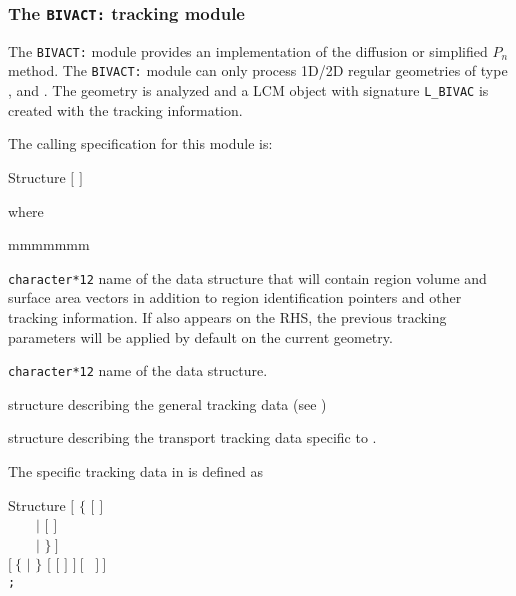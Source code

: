 \subsubsection{The {\tt BIVACT:} tracking module}\label{sect:BIVACData}

The {\tt BIVACT:} module provides an implementation of the diffusion or simplified $P_n$ method. The {\tt BIVACT:} module can only process
1D/2D regular geometries of type ,  and . The geometry is analyzed and
a LCM object with signature {\tt L\_BIVAC} is created with the tracking information.

\vskip 0.2cm

The calling specification for this module is:

\begin{DataStructure}{Structure }
\moc{:=}  $[$  $]$ 
 \moc{::}   
\end{DataStructure}

\noindent  where
\begin{ListeDeDescription}{mmmmmmm}

\item[\dusa{TRKNAM}] {\tt character*12} name of the  data
structure that will contain region volume and surface area vectors in
addition to region identification pointers and other tracking information.
If  also appears on the RHS, the previous tracking 
parameters will be applied by default on the current geometry.

\item[\dusa{GEONAM}] {\tt character*12} name of the  data
structure.

\item[\dstr{desctrack}] structure describing the general tracking data (see
)

\item[\dstr{descbivac}] structure describing the transport tracking data
specific to .

\end{ListeDeDescription}

\vskip 0.2cm

The  specific tracking data in  is defined as

\begin{DataStructure}{Structure }
$[$ $\{$  $[$   $]$ \\
~~~~$|$  $[$   $]$ \\
~~~~$|$  $\}~]$ \\
$[~\{$  $|$  $\}$  $[$  $[$  $]$  $]~[$  ~$]~]$ \\
{\tt ;}
\end{DataStructure}

